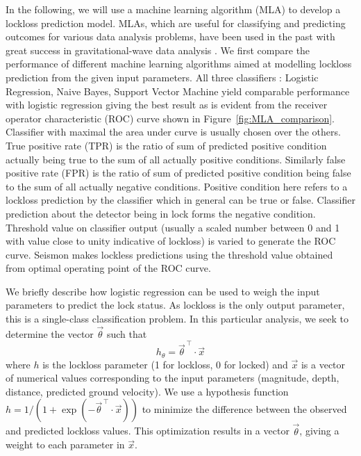 \documentclass[reprint, prl, aps, showpacs]{revtex4-1}
\begin{document}
In the following, we will use a machine learning algorithm (MLA) to develop a lockloss prediction model. MLAs, which are useful for classifying and predicting outcomes for various data analysis problems, have been used in the past with great success in gravitational-wave data analysis \cite{BiBl2013,KyHa2015}. We first compare the performance of different machine learning algorithms aimed at modelling lockloss prediction from the given input parameters.  All three classifiers : Logistic Regression\cite{mccullagh_glm}, Naive Bayes\cite{John_NaiveBayes}, Support Vector Machine\cite{Burges_SVM} yield comparable performance with logistic regression giving the best result as is evident from the  receiver operator characteristic (ROC) curve shown in Figure~\ref{fig:MLA_comparison}. Classifier with maximal the area under curve is usually chosen over  the others. True positive rate (TPR) is the ratio of sum of predicted positive condition actually being true to the sum of all actually positive conditions. Similarly false positive rate (FPR) is the ratio of sum of predicted positive condition being false to the sum of all actually negative conditions. Positive condition here refers to a lockloss prediction by the classifier which in general can be true or false. Classifier prediction about the detector being in lock  forms the negative condition. Threshold value on classifier output (usually a scaled number between 0 and 1 with value close to unity indicative of lockloss) is varied to generate the ROC curve. Seismon makes lockless predictions using the threshold value obtained from optimal operating point of the ROC curve. 	


We briefly describe how logistic regression can be used to weigh the input parameters to predict the lock status. As lockloss is the only output parameter, this is a single-class classification problem. In this particular analysis, we seek to determine the vector $\vec\theta$ such that 
\begin{equation}
h_{\theta} = \vec\theta^{\,\top}\cdot\vec x
\label{eq:MLA}
\end{equation}
where $h$ is the lockloss parameter (1 for lockloss, 0 for locked) and $\vec x$ is a vector of numerical values corresponding to the input parameters (magnitude, depth, distance, predicted ground velocity). We use a hypothesis function $h=1/(1+\exp(-\vec\theta^{\,\top}\cdot \vec x))$ to minimize the difference between the observed and predicted lockloss values. This optimization results in a vector $\vec\theta$, giving a weight to each parameter in $\vec x$.
			
\end{document}

